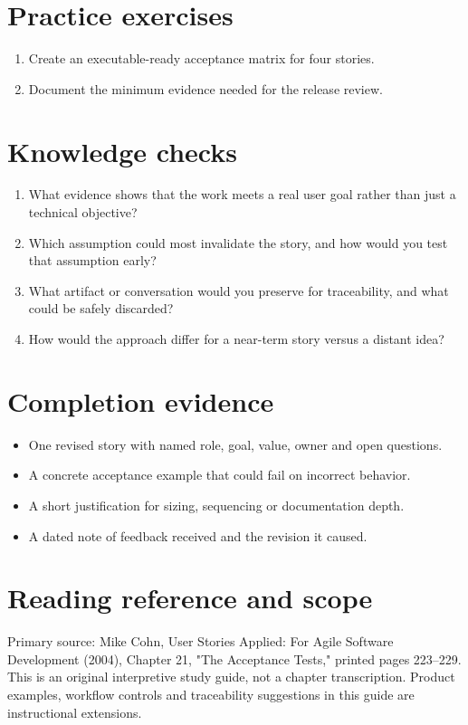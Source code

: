 \documentclass[11pt,letterpaper]{article}
\begin{document}
\section{Practice exercises}
\begin{enumerate}[leftmargin=*,itemsep=3pt]
\item Create an executable-ready acceptance matrix for four stories.
\item Document the minimum evidence needed for the release review.
\end{enumerate}
\section{Knowledge checks}
\begin{enumerate}[leftmargin=*,itemsep=3pt]
\item What evidence shows that the work meets a real user goal rather than just a technical objective?
\item Which assumption could most invalidate the story, and how would you test that assumption early?
\item What artifact or conversation would you preserve for traceability, and what could be safely discarded?
\item How would the approach differ for a near-term story versus a distant idea?
\end{enumerate}
\section{Completion evidence}
\begin{itemize}[leftmargin=*,itemsep=2pt]
\item One revised story with named role, goal, value, owner and open questions.
\item A concrete acceptance example that could fail on incorrect behavior.
\item A short justification for sizing, sequencing or documentation depth.
\item A dated note of feedback received and the revision it caused.
\end{itemize}
\section{Reading reference and scope}
Primary source: Mike Cohn, User Stories Applied: For Agile Software Development (2004), Chapter 21, "The Acceptance Tests," printed pages 223–229. This is an original interpretive study guide, not a chapter transcription. Product examples, workflow controls and traceability suggestions in this guide are instructional extensions.
\end{document}

